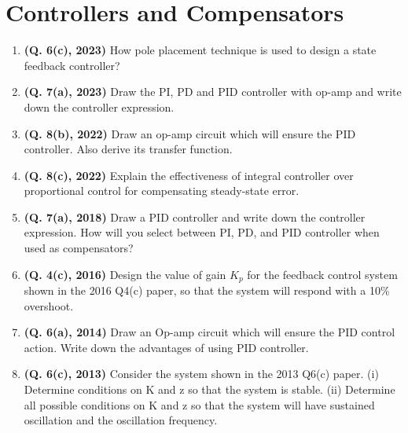 \documentclass[12pt, a4paper]{article}
\begin{document}
	\section{Controllers and Compensators}
	\begin{enumerate}
		\item \textbf{(Q. 6(c), 2023)} How pole placement technique is used to design a state feedback controller?
		\item \textbf{(Q. 7(a), 2023)} Draw the PI, PD and PID controller with op-amp and write down the controller expression.
		\item \textbf{(Q. 8(b), 2022)} Draw an op-amp circuit which will ensure the PID controller. Also derive its transfer function.
		\item \textbf{(Q. 8(c), 2022)} Explain the effectiveness of integral controller over proportional control for compensating steady-state error.
		\item \textbf{(Q. 7(a), 2018)} Draw a PID controller and write down the controller expression. How will you select between PI, PD, and PID controller when used as compensators?
		\item \textbf{(Q. 4(c), 2016)} Design the value of gain $K_p$ for the feedback control system shown in the 2016 Q4(c) paper, so that the system will respond with a 10\% overshoot.
		\item \textbf{(Q. 6(a), 2014)} Draw an Op-amp circuit which will ensure the PID control action. Write down the advantages of using PID controller.
		\item \textbf{(Q. 6(c), 2013)} Consider the system shown in the 2013 Q6(c) paper. (i) Determine conditions on K and z so that the system is stable. (ii) Determine all possible conditions on K and z so that the system will have sustained oscillation and the oscillation frequency.
	\end{enumerate}
	
\end{document}
